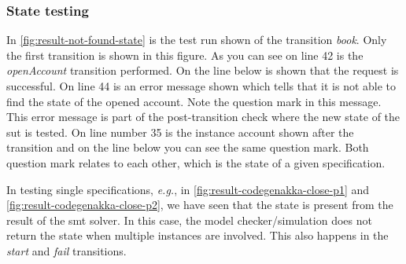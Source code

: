 \subsubsection{State testing}

In \autoref{fig:result-not-found-state} is the test run shown of the transition
\textit{book}. Only the first transition is shown in this figure. As you can
see on line 42 is the \textit{openAccount} transition performed. On the line
below is shown that the request is successful. On line 44 is an error message
shown which tells that it is not able to find the state of the opened account.
Note the question mark in this message. This error message is part of the
post-transition check where the new state of the \gls{sut} is tested. On line number
35 is the instance account shown after the transition and on the line below you
can see the same question mark. Both question mark relates to each other, which
is the state of a given specification.

In testing single specifications, \textit{e.g.}, in
\autoref{fig:result-codegenakka-close-p1} and \autoref{fig:result-codegenakka-close-p2}, we have seen that the state is present
from the result of the \gls{smt} solver. In this case, the model checker/simulation
does not return the state when multiple instances are involved. This also
happens in the \textit{start} and \textit{fail} transitions.

